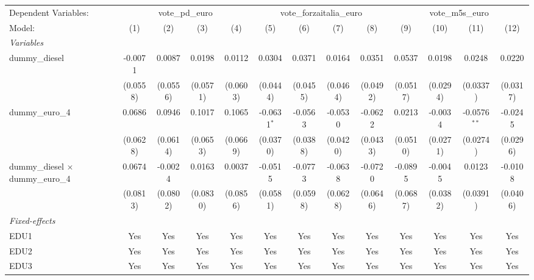 \begingroup
\centering
\begin{tabular}{lcccccccccccc}
   \tabularnewline \midrule \midrule
   Dependent Variables: & \multicolumn{4}{c}{vote\_pd\_euro} & \multicolumn{4}{c}{vote\_forzaitalia\_euro} & \multicolumn{4}{c}{vote\_m5s\_euro}\\
   Model:                                    & (1)      & (2)      & (3)      & (4)      & (5)           & (6)      & (7)      & (8)      & (9)      & (10)     & (11)           & (12)\\  
   \midrule
   \emph{Variables}\\
   dummy\_diesel                             & -0.0071  & 0.0087   & 0.0198   & 0.0112   & 0.0304        & 0.0371   & 0.0164   & 0.0351   & 0.0537   & 0.0198   & 0.0248         & 0.0220\\   
                                             & (0.0558) & (0.0556) & (0.0571) & (0.0603) & (0.0444)      & (0.0455) & (0.0464) & (0.0492) & (0.0517) & (0.0294) & (0.0337)       & (0.0317)\\   
   dummy\_euro\_4                            & 0.0686   & 0.0946   & 0.1017   & 0.1065   & -0.0631$^{*}$ & -0.0563  & -0.0530  & -0.0622  & 0.0213   & -0.0034  & -0.0576$^{**}$ & -0.0245\\   
                                             & (0.0628) & (0.0614) & (0.0653) & (0.0669) & (0.0370)      & (0.0388) & (0.0420) & (0.0433) & (0.0510) & (0.0271) & (0.0274)       & (0.0296)\\   
   dummy\_diesel $\times$ dummy\_euro\_4     & 0.0674   & -0.0024  & 0.0163   & 0.0037   & -0.0515       & -0.0773  & -0.0638  & -0.0720  & -0.0895  & -0.0045  & 0.0123         & -0.0108\\   
                                             & (0.0813) & (0.0802) & (0.0830) & (0.0856) & (0.0581)      & (0.0598) & (0.0628) & (0.0646) & (0.0687) & (0.0382) & (0.0391)       & (0.0406)\\   
   \midrule
   \emph{Fixed-effects}\\
   EDU1                                      & Yes      & Yes      & Yes      & Yes      & Yes           & Yes      & Yes      & Yes      & Yes      & Yes      & Yes            & Yes\\  
   EDU2                                      & Yes      & Yes      & Yes      & Yes      & Yes           & Yes      & Yes      & Yes      & Yes      & Yes      & Yes            & Yes\\  
   EDU3                                      & Yes      & Yes      & Yes      & Yes      & Yes           & Yes      & Yes      & Yes      & Yes      & Yes      & Yes            & Yes\\  

\end{tabular}
